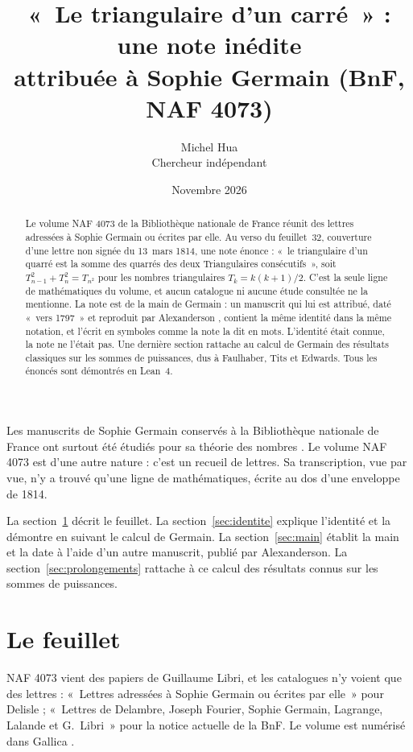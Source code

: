 \documentclass[11pt,a4paper]{article}
\title{«~Le triangulaire d'un carré~» : une note inédite\\
attribuée à Sophie Germain (BnF, NAF 4073)}
\author{Michel Hua\\\small Chercheur indépendant}
\date{Novembre 2026}
\theoremstyle{remark}
\begin{document}
\maketitle

\begin{abstract}
Le volume NAF 4073 de la Bibliothèque nationale de France réunit des lettres
adressées à Sophie Germain ou écrites par elle. Au verso du feuillet~32,
couverture d'une lettre non signée du 13~mars 1814, une note énonce :
«~le triangulaire d'un quarré est la somme des quarrés des deux Triangulaires
consécutifs~», soit $T_{n-1}^2 + T_n^2 = T_{n^2}$ pour les nombres
triangulaires $T_k = k(k+1)/2$. C'est la seule ligne de mathématiques du
volume, et aucun catalogue ni aucune étude consultée ne la mentionne. La note
est de la main de Germain : un manuscrit qui lui est attribué, daté
«~vers 1797~» et reproduit par Alexanderson \cite{alexanderson}, contient la
même identité dans la même notation, et l'écrit en symboles comme la note la
dit en mots. L'identité était connue, la note ne l'était pas. Une dernière
section rattache au calcul de Germain des résultats classiques sur les sommes
de puissances, dus à Faulhaber, Tits et Edwards. Tous les énoncés sont
démontrés en Lean~4.
\end{abstract}

Les manuscrits de Sophie Germain conservés à la Bibliothèque nationale de
France ont surtout été étudiés pour sa théorie des nombres
\cite{laubenbacher-pengelley}. Le volume NAF 4073 est d'une autre nature :
c'est un recueil de lettres. Sa transcription, vue par vue, n'y a trouvé
qu'une ligne de mathématiques, écrite au dos d'une enveloppe de 1814.

La section~\ref{sec:feuillet} décrit le feuillet. La
section~\ref{sec:identite} explique l'identité et la démontre en suivant le
calcul de Germain. La section~\ref{sec:main} établit la main et la date à
l'aide d'un autre manuscrit, publié par Alexanderson. La
section~\ref{sec:prolongements} rattache à ce calcul des résultats connus
sur les sommes de puissances.

\section{Le feuillet}\label{sec:feuillet}

NAF 4073 vient des papiers de Guillaume Libri, et les catalogues n'y voient
que des lettres : «~Lettres adressées à Sophie Germain ou écrites par elle~»
pour Delisle \cite[p.~183]{delisle} ; «~Lettres de Delambre, Joseph Fourier,
Sophie Germain, Lagrange, Lalande et G.~Libri~» pour la notice actuelle de la
BnF. Le volume est numérisé dans Gallica \cite{gallica}.
\end{document}
